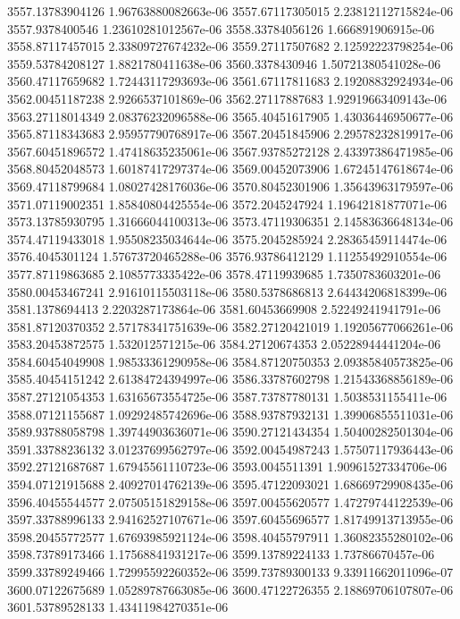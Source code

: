 {3557.13783904126 1.96763880082663e-06
3557.67117305015 2.23812112715824e-06
3557.9378400546 1.23610281012567e-06
3558.33784056126 1.666891906915e-06
3558.87117457015 2.33809727674232e-06
3559.27117507682 2.12592223798254e-06
3559.53784208127 1.8821780411638e-06
3560.3378430946 1.50721380541028e-06
3560.47117659682 1.72443117293693e-06
3561.67117811683 2.19208832924934e-06
3562.00451187238 2.9266537101869e-06
3562.27117887683 1.92919663409143e-06
3563.27118014349 2.08376232096588e-06
3565.40451617905 1.43036446950677e-06
3565.87118343683 2.95957790768917e-06
3567.20451845906 2.29578232819917e-06
3567.60451896572 1.47418635235061e-06
3567.93785272128 2.43397386471985e-06
3568.80452048573 1.60187417297374e-06
3569.00452073906 1.67245147618674e-06
3569.47118799684 1.08027428176036e-06
3570.80452301906 1.35643963179597e-06
3571.07119002351 1.85840804425554e-06
3572.2045247924 1.19642181877071e-06
3573.13785930795 1.31666044100313e-06
3573.47119306351 2.14583636648134e-06
3574.47119433018 1.95508235034644e-06
3575.2045285924 2.28365459114474e-06
3576.4045301124 1.57673720465288e-06
3576.93786412129 1.11255492910554e-06
3577.87119863685 2.1085773335422e-06
3578.47119939685 1.7350783603201e-06
3580.00453467241 2.91610115503118e-06
3580.5378686813 2.64434206818399e-06
3581.1378694413 2.2203287173864e-06
3581.60453669908 2.52249241941791e-06
3581.87120370352 2.57178341751639e-06
3582.27120421019 1.19205677066261e-06
3583.20453872575 1.532012571215e-06
3584.27120674353 2.05228944441204e-06
3584.60454049908 1.98533361290958e-06
3584.87120750353 2.09385840573825e-06
3585.40454151242 2.61384724394997e-06
3586.33787602798 1.21543368856189e-06
3587.27121054353 1.63165673554725e-06
3587.73787780131 1.5038531155411e-06
3588.07121155687 1.09292485742696e-06
3588.93787932131 1.39906855511031e-06
3589.93788058798 1.39744903636071e-06
3590.27121434354 1.50400282501304e-06
3591.33788236132 3.01237699562797e-06
3592.00454987243 1.57507117936443e-06
3592.27121687687 1.67945561110723e-06
3593.0045511391 1.90961527334706e-06
3594.07121915688 2.40927014762139e-06
3595.47122093021 1.68669729908435e-06
3596.40455544577 2.07505151829158e-06
3597.00455620577 1.47279744122539e-06
3597.33788996133 2.94162527107671e-06
3597.60455696577 1.81749913713955e-06
3598.20455772577 1.67693985921124e-06
3598.40455797911 1.36082355280102e-06
3598.73789173466 1.17568841931217e-06
3599.13789224133 1.73786670457e-06
3599.33789249466 1.72995592260352e-06
3599.73789300133 9.33911662011096e-07
3600.07122675689 1.05289787663085e-06
3600.47122726355 2.18869706107807e-06
3601.53789528133 1.43411984270351e-06
}
